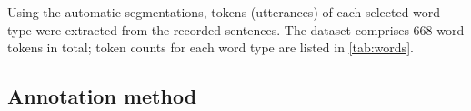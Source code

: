 \documentclass[a4paper]{article}
\newcommand{\TODO}[1]{{\color{red}\textbf{[TODO #1]}}}
\begin{document}
	Using the automatic segmentations, tokens (utterances) of each selected word type were extracted from the recorded sentences.
	The dataset comprises 668 word tokens in total; 
	token counts for each word type are listed in \cref{tab:words}. 
		
		\subsection{Annotation method}
		\label{sec:data:annotation}	
		
\end{document}
